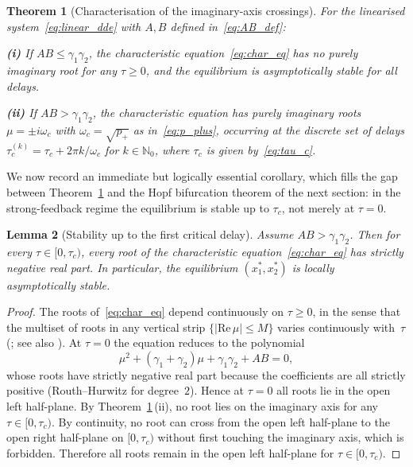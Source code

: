 \documentclass[sn-mathphys,Numbered]{sn-jnl}
\theoremstyle{thmstyleone}
\newtheorem{theorem}{Theorem}
\newtheorem{lemma}[theorem]{Lemma}
\theoremstyle{thmstyletwo}
\theoremstyle{thmstylethree}
\begin{document}
\begin{theorem}[Characterisation of the imaginary-axis crossings]
\label{thm:hopf_existence}
For the linearised system~\eqref{eq:linear_dde} with $A,B$ defined
in~\eqref{eq:AB_def}:

\noindent\textbf{(i)} If $AB\leq\gamma_1\gamma_2$, the characteristic
equation~\eqref{eq:char_eq} has no purely imaginary root for any
$\tau\geq 0$, and the equilibrium is asymptotically stable for all delays.

\noindent\textbf{(ii)} If $AB>\gamma_1\gamma_2$, the characteristic
equation has purely imaginary roots $\mu=\pm i\omega_c$ with
$\omega_c=\sqrt{p_+}$ as in~\eqref{eq:p_plus}, occurring at the discrete
set of delays
$\tau_c^{(k)}=\tau_c+2\pi k/\omega_c$ for $k\in\mathbb{N}_0$, where
$\tau_c$ is given by~\eqref{eq:tau_c}.
\end{theorem}

We now record an immediate but logically essential corollary, which fills
the gap between Theorem~\ref{thm:hopf_existence} and the Hopf bifurcation
theorem of the next section: in the strong-feedback regime the
equilibrium is stable up to $\tau_c$, not merely at $\tau=0$.

\begin{lemma}[Stability up to the first critical delay]
\label{lem:stable_below_tauc}
Assume $AB>\gamma_1\gamma_2$. Then for every $\tau\in[0,\tau_c)$, every
root of the characteristic equation~\eqref{eq:char_eq} has strictly
negative real part. In particular, the equilibrium $(x_1^*,x_2^*)$ is
locally asymptotically stable.
\end{lemma}
\begin{proof}
The roots of~\eqref{eq:char_eq} depend continuously on $\tau\geq 0$, in
the sense that the multiset of roots in any vertical strip
$\{|\mathrm{Re}\,\mu|\leq M\}$ varies continuously with~$\tau$
(\cite{cooke1986zeroes}; see also \cite[Ch.~XI]{hale1993introduction}). At $\tau=0$ the
equation reduces to the polynomial
\[
\mu^2 + (\gamma_1+\gamma_2)\mu + \gamma_1\gamma_2 + AB = 0,
\]
whose roots have strictly negative real part because the coefficients
are all strictly positive (Routh--Hurwitz for degree~$2$). Hence at
$\tau=0$ all roots lie in the open left half-plane. By
Theorem~\ref{thm:hopf_existence}\,(ii), no root lies on the imaginary
axis for any $\tau\in[0,\tau_c)$. By continuity, no root can cross from
the open left half-plane to the open right half-plane on
$[0,\tau_c)$ without first touching the imaginary axis, which is
forbidden. Therefore all roots remain in the open left half-plane for
$\tau\in[0,\tau_c)$.
\end{proof}
\end{document}
